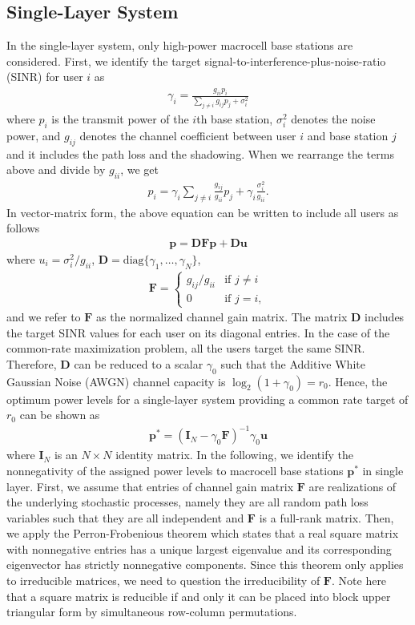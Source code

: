 \documentclass[conference,letterpaper,final,10pt]{IEEEtran}
\newcommand{\bea}{\begin{eqnarray}}
\newcommand{\eea}{\end{eqnarray}}
\begin{document}
\subsection{Single-Layer System}
In the single-layer system, only high-power macrocell base stations are considered. First, we identify the target signal-to-interference-plus-noise-ratio (SINR) for user $i$ as \bea \gamma_i =
\frac{g_{ii}p_i}{\sum\limits_{j \neq i} g_{ij}p_j + \sigma_i^2}
\eea where $p_i$ is the transmit power of the $i$th base
station, $\sigma_i^2$ denotes the noise power, and $g_{ij}$ denotes the channel coefficient between user $i$ and base station $j$ and it includes the path loss and the shadowing. When we rearrange the terms above and divide by
$g_{ii}$, we get \bea p_i = \gamma_i \sum\limits_{j \neq i}
\frac{g_{ij}}{g_{ii}}p_j + \gamma_i \frac{\sigma_i^2}{g_{ii}}.
\eea In vector-matrix form, the above equation can be written to
include all users as follows \bea \textbf{p} = \textbf{DF}
\textbf{p} + \textbf{D} \textbf{u} \label{p_dfp_u}\eea where $ u_i = \sigma_i^2 /
g_{ii}$, $\textbf{D} = \mathrm{diag}\{\gamma_1,\ldots,\gamma_N\}$,
\begin{align} \textbf{F} = \begin{cases}g_{ij}/g_{ii} & \text{if } j \neq i \\ 0 & \text{if } j = i, \end{cases}
\end{align} and we refer to $\textbf{F}$ as the normalized channel gain matrix. The matrix $\textbf{D}$ includes the target SINR values for each user on its diagonal entries. In the case of the common-rate maximization problem, all the users target the same SINR. Therefore, $\textbf{D}$ can be reduced to a scalar $\gamma_0$ such that the Additive White Gaussian Noise (AWGN) channel capacity is $\log_2(1+\gamma_0) = r_0$. Hence, the optimum power levels for a single-layer system providing a common rate target of $r_0$ can be shown as
\bea \textbf{p}^* = (\textbf{I}_N - \gamma_0 \textbf{F})^{-1} \gamma_0
\textbf{u} \label{opt_single}\eea
where $\textbf{I}_N$ is an $N\times N$ identity matrix. In the following, we identify the nonnegativity of the assigned power levels to macrocell base stations $\textbf{p}^*$ in single layer. First, we assume that entries of channel gain matrix $\textbf{F}$ are realizations of the underlying stochastic processes, namely they are all random path loss variables such that they are all independent and $\textbf{F}$ is a full-rank matrix. Then, we apply the Perron-Frobenious theorem \cite{TheoryOfMatrices} which states that a real square matrix with nonnegative entries has a unique largest eigenvalue and its corresponding eigenvector has strictly nonnegative components. Since this theorem only applies to irreducible matrices, we need to question the irreducibility of $\textbf{F}$. Note here that a square matrix is reducible if and only it can be placed into block upper triangular form by simultaneous row-column permutations.
\end{document}
